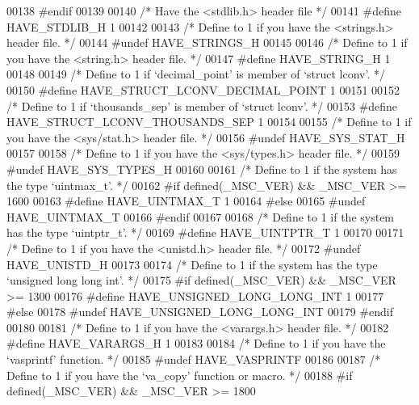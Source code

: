 \begin{DoxyCode}
00138 \textcolor{preprocessor}{#endif}
00139 
00140 \textcolor{comment}{/* Have the <stdlib.h> header file */}
00141 \textcolor{preprocessor}{#define HAVE\_STDLIB\_H 1}
00142 
00143 \textcolor{comment}{/* Define to 1 if you have the <strings.h> header file. */}
00144 \textcolor{preprocessor}{#undef HAVE\_STRINGS\_H}
00145 
00146 \textcolor{comment}{/* Define to 1 if you have the <string.h> header file. */}
00147 \textcolor{preprocessor}{#define HAVE\_STRING\_H 1}
00148 
00149 \textcolor{comment}{/* Define to 1 if `decimal\_point' is member of `struct lconv'. */}
00150 \textcolor{preprocessor}{#define HAVE\_STRUCT\_LCONV\_DECIMAL\_POINT 1}
00151 
00152 \textcolor{comment}{/* Define to 1 if `thousands\_sep' is member of `struct lconv'. */}
00153 \textcolor{preprocessor}{#define HAVE\_STRUCT\_LCONV\_THOUSANDS\_SEP 1}
00154 
00155 \textcolor{comment}{/* Define to 1 if you have the <sys/stat.h> header file. */}
00156 \textcolor{preprocessor}{#undef HAVE\_SYS\_STAT\_H}
00157 
00158 \textcolor{comment}{/* Define to 1 if you have the <sys/types.h> header file. */}
00159 \textcolor{preprocessor}{#undef HAVE\_SYS\_TYPES\_H}
00160 
00161 \textcolor{comment}{/* Define to 1 if the system has the type `uintmax\_t'. */}
00162 \textcolor{preprocessor}{#if defined(\_MSC\_VER) && \_MSC\_VER >= 1600}
00163 \textcolor{preprocessor}{#define HAVE\_UINTMAX\_T 1}
00164 \textcolor{preprocessor}{#else}
00165 \textcolor{preprocessor}{#undef HAVE\_UINTMAX\_T}
00166 \textcolor{preprocessor}{#endif}
00167 
00168 \textcolor{comment}{/* Define to 1 if the system has the type `uintptr\_t'. */}
00169 \textcolor{preprocessor}{#define HAVE\_UINTPTR\_T 1}
00170 
00171 \textcolor{comment}{/* Define to 1 if you have the <unistd.h> header file. */}
00172 \textcolor{preprocessor}{#undef HAVE\_UNISTD\_H}
00173 
00174 \textcolor{comment}{/* Define to 1 if the system has the type `unsigned long long int'. */}
00175 \textcolor{preprocessor}{#if defined(\_MSC\_VER) && \_MSC\_VER >= 1300}
00176 \textcolor{preprocessor}{#define HAVE\_UNSIGNED\_LONG\_LONG\_INT 1}
00177 \textcolor{preprocessor}{#else}
00178 \textcolor{preprocessor}{#undef HAVE\_UNSIGNED\_LONG\_LONG\_INT}
00179 \textcolor{preprocessor}{#endif}
00180 
00181 \textcolor{comment}{/* Define to 1 if you have the <varargs.h> header file. */}
00182 \textcolor{preprocessor}{#define HAVE\_VARARGS\_H 1}
00183 
00184 \textcolor{comment}{/* Define to 1 if you have the `vasprintf' function. */}
00185 \textcolor{preprocessor}{#undef HAVE\_VASPRINTF}
00186 
00187 \textcolor{comment}{/* Define to 1 if you have the `va\_copy' function or macro. */}
00188 \textcolor{preprocessor}{#if defined(\_MSC\_VER) && \_MSC\_VER >= 1800}

\end{DoxyCode}
